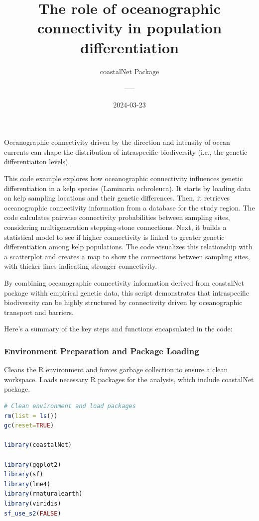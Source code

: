 \documentclass[
]{article}
\title{The role of oceanographic connectivity in population
differentiation}
\subtitle{coastalNet Package}
\author{-----}
\date{2024-03-23}
\begin{document}
\maketitle

Oceanographic connectivity driven by the direction and intensity of
ocean currents can shape the distribution of intraspecific biodiversity
(i.e., the genetic differentiaiton levels).

This code example explores how oceanographic connectivity influences
genetic differentiation in a kelp species (Laminaria ochroleuca). It
starts by loading data on kelp sampling locations and their genetic
differences. Then, it retrieves oceanographic connectivity information
from a database for the study region. The code calculates pairwise
connectivity probabilities between sampling sites, considering
multigeneration stepping-stone connections. Next, it builds a
statistical model to see if higher connectivity is linked to greater
genetic differentiation among kelp populations. The code visualizes this
relationship with a scatterplot and creates a map to show the
connections between sampling sites, with thicker lines indicating
stronger connectivity.

By combining oceanographic connectivity information derived from
coastalNet package withh empirical genetic data, this script
demonstrates that intraspecific biodiversity can be highly structured by
connectivity driven by oceanographic transport and barriers.

Here's a summary of the key steps and functions encapsulated in the
code:

\subsubsection{Environment Preparation and Package
Loading}\label{environment-preparation-and-package-loading}

Cleans the R environment and forces garbage collection to ensure a clean
workspace. Loads necessary R packages for the analysis, which include
coastalNet package.

\begin{lstlisting}[language=R]
# Clean environment and load packages
rm(list = ls())
gc(reset=TRUE)

library(coastalNet)

library(ggplot2)
library(sf)
library(lme4)
library(rnaturalearth)
library(viridis)
sf_use_s2(FALSE)
\end{lstlisting}
\end{document}
